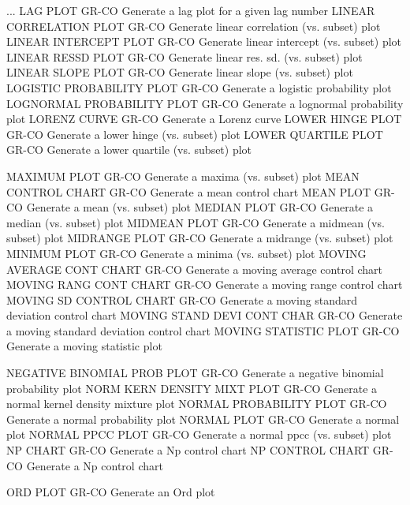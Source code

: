 ... LAG PLOT                GR-CO Generate a lag plot for a given lag number
LINEAR CORRELATION PLOT     GR-CO Generate linear correlation (vs. subset) plot
LINEAR INTERCEPT PLOT       GR-CO Generate linear intercept (vs. subset) plot
LINEAR RESSD PLOT           GR-CO Generate linear res. sd. (vs. subset) plot
LINEAR SLOPE PLOT           GR-CO Generate linear slope (vs. subset) plot
LOGISTIC PROBABILITY PLOT   GR-CO Generate a logistic probability plot
LOGNORMAL PROBABILITY PLOT  GR-CO Generate a lognormal probability plot
LORENZ CURVE                GR-CO Generate a Lorenz curve
LOWER HINGE PLOT            GR-CO Generate a lower hinge (vs. subset) plot
LOWER QUARTILE PLOT         GR-CO Generate a lower quartile (vs. subset) plot

MAXIMUM PLOT                GR-CO Generate a maxima (vs. subset) plot
MEAN CONTROL CHART          GR-CO Generate a mean control chart
MEAN PLOT                   GR-CO Generate a mean (vs. subset) plot
MEDIAN PLOT                 GR-CO Generate a median (vs. subset) plot
MIDMEAN PLOT                GR-CO Generate a midmean (vs. subset) plot
MIDRANGE PLOT               GR-CO Generate a midrange (vs. subset) plot
MINIMUM PLOT                GR-CO Generate a minima (vs. subset) plot
MOVING AVERAGE CONT CHART   GR-CO Generate a moving average control chart
MOVING RANG CONT CHART      GR-CO Generate a moving range control chart
MOVING SD CONTROL CHART     GR-CO Generate a moving standard deviation control chart
MOVING STAND DEVI CONT CHAR GR-CO Generate a moving standard deviation control chart
MOVING STATISTIC PLOT       GR-CO Generate a moving statistic plot

NEGATIVE BINOMIAL PROB PLOT GR-CO Generate a negative binomial probability plot
NORM KERN DENSITY MIXT PLOT GR-CO Generate a normal kernel density mixture plot
NORMAL PROBABILITY PLOT     GR-CO Generate a normal probability plot
NORMAL PLOT                 GR-CO Generate a normal plot
NORMAL PPCC PLOT            GR-CO Generate a normal ppcc (vs. subset) plot
NP CHART                    GR-CO Generate a Np control chart
NP CONTROL CHART            GR-CO Generate a Np control chart

ORD PLOT                    GR-CO Generate an Ord plot

